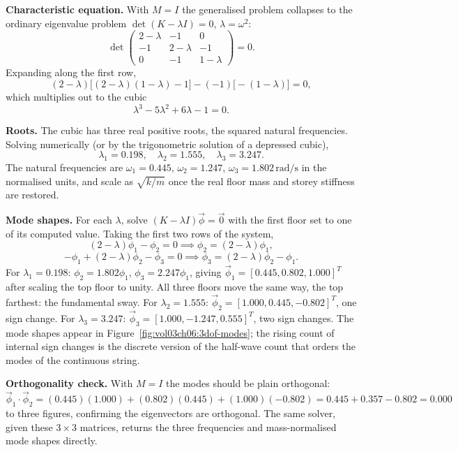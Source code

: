 \textbf{Characteristic equation.} With $M = I$ the generalised problem
collapses to the ordinary eigenvalue problem $\det(K - \lambda I) = 0$,
$\lambda = \omega^2$:
\[
\det\begin{pmatrix} 2 - \lambda & -1 & 0 \\ -1 & 2 - \lambda & -1 \\ 0 &
-1 & 1 - \lambda \end{pmatrix} = 0.
\]
Expanding along the first row,
\[
(2 - \lambda)\big[(2 - \lambda)(1 - \lambda) - 1\big] - (-1)\big[-(1 -
\lambda)\big] = 0,
\]
which multiplies out to the cubic
\[
\lambda^3 - 5\lambda^2 + 6\lambda - 1 = 0.
\]

\textbf{Roots.} The cubic has three real positive roots, the squared
natural frequencies. Solving numerically (or by the trigonometric
solution of a depressed cubic),
\[
\lambda_1 = 0.198, \quad \lambda_2 = 1.555, \quad \lambda_3 = 3.247.
\]
The natural frequencies are $\omega_1 = 0.445$, $\omega_2 = 1.247$,
$\omega_3 = 1.802\,\si{\radian\per\second}$ in the normalised units, and
scale as $\sqrt{k/m}$ once the real floor mass and storey stiffness are
restored.

\textbf{Mode shapes.} For each $\lambda$, solve $(K - \lambda I)\vec\phi
= \vec0$ with the first floor set to one of its computed value. Taking
the first two rows of the system,
\[
(2 - \lambda)\phi_1 - \phi_2 = 0 \implies \phi_2 = (2 - \lambda)\phi_1,
\]
\[
-\phi_1 + (2 - \lambda)\phi_2 - \phi_3 = 0 \implies \phi_3 = (2 -
\lambda)\phi_2 - \phi_1.
\]
For $\lambda_1 = 0.198$: $\phi_2 = 1.802\phi_1$, $\phi_3 = 2.247\phi_1$,
giving $\vec\phi_1 = [0.445, 0.802, 1.000]^T$ after scaling the top
floor to unity. All three floors move the same way, the top farthest:
the fundamental sway. For $\lambda_2 = 1.555$: $\vec\phi_2 = [1.000,
0.445, -0.802]^T$, one sign change. For $\lambda_3 = 3.247$:
$\vec\phi_3 = [1.000, -1.247, 0.555]^T$, two sign changes. The mode
shapes appear in Figure~\ref{fig:vol03ch06:3dof-modes}; the rising count
of internal sign changes is the discrete version of the half-wave count
that orders the modes of the continuous string.



\textbf{Orthogonality check.} With $M = I$ the modes should be plain
orthogonal: $\vec\phi_1\cdot\vec\phi_2 = (0.445)(1.000) +
(0.802)(0.445) + (1.000)(-0.802) = 0.445 + 0.357 - 0.802 = 0.000$ to
three figures, confirming the eigenvectors are orthogonal. The same
 solver, given these $3\times3$ matrices,
returns the three frequencies and mass-normalised mode shapes directly.


